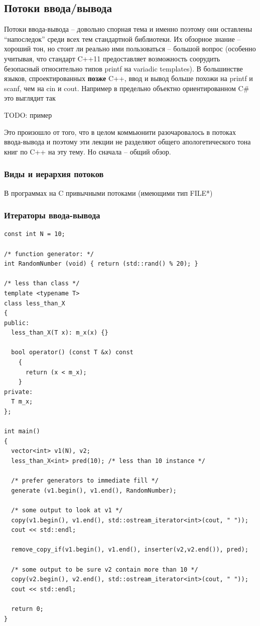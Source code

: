 \documentclass[a4paper,12pt,oneside]{article}
\begin{document}
\subsection{Потоки ввода/вывода}

Потоки ввода-вывода -- довольно спорная тема и именно поэтому они оставлены ``напоследок'' среди всех тем стандартной библиотеки. Их обзорное знание -- хороший тон, но стоит ли реально ими пользоваться -- большой вопрос (особенно учитывая, что стандарт C++11 предоставляет возможность соорудить безопасный относительно типов printf на variadic templates). В большинстве языков, спроектированных \textbf{позже} C++, ввод и вывод больше похожи на printf и scanf, чем на cin и cout. Например в предельно объектно ориентированном C\# это выглядит так

TODO: пример

Это произошло от того, что в целом коммьюнити разочаровалось в потоках ввода-вывода и поэтому эти лекции не разделяют общего апологетического тона книг по C++ на эту тему. Но сначала -- общий обзор.

\subsubsection{Виды и иерархия потоков}

В программах на C привычными потоками (имеющими тип FILE*)

\subsubsection{Итераторы ввода-вывода}

\begin{lstlisting}
const int N = 10;

/* function generator: */
int RandomNumber (void) { return (std::rand() % 20); }

/* less than class */
template <typename T>
class less_than_X
{
public:
  less_than_X(T x): m_x(x) {}

  bool operator() (const T &x) const
    {
      return (x < m_x);
    }
private:
  T m_x;
};

int main() 
{
  vector<int> v1(N), v2;
  less_than_X<int> pred(10); /* less than 10 instance */

  /* prefer generators to immediate fill */
  generate (v1.begin(), v1.end(), RandomNumber);

  /* some output to look at v1 */
  copy(v1.begin(), v1.end(), std::ostream_iterator<int>(cout, " "));
  cout << std::endl;

  remove_copy_if(v1.begin(), v1.end(), inserter(v2,v2.end()), pred);

  /* some output to be sure v2 contain more than 10 */
  copy(v2.begin(), v2.end(), std::ostream_iterator<int>(cout, " "));
  cout << std::endl;

  return 0;
}
\end{lstlisting}
\end{document}
